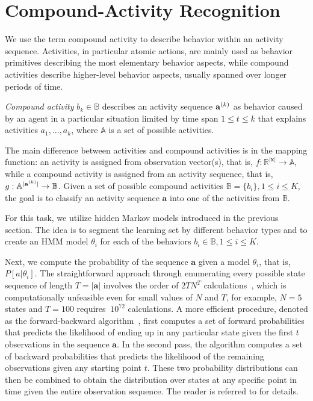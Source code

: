 %
%
\section{Compound-Activity Recognition}
\label{sec:ar:interactions}

We use the term compound activity to describe behavior within an activity sequence. %
Activities, in particular atomic actions, are mainly used as behavior primitives describing the most elementary behavior aspects, while compound activities describe higher-level behavior aspects, usually spanned over longer periods of time.

\begin{definition}
\label{def:compound_activity}
	\emph{Compound activity} $b_k \in \mathbb{B}$ describes an activity sequence $\mathbf{a}^{\scriptsize(k)}$ as behavior caused by an agent in a particular situation limited by time span $1 \leq t \leq k$ that explains activities $a_1, ..., a_k$, where $\mathbb{A}$ is a set of possible activities.
\end{definition}

The main difference between activities and compound activities is in the mapping function: an activity is assigned from observation vector(s), that is, $f: \mathbb{R}^{|\mathbf{x}|} \rightarrow \mathbb{A}$, while a compound activity is assigned from an activity sequence, that is, $g: \mathbb{A}^{|\mathbf{a}^{\scriptsize(k)}|} \rightarrow \mathbb{B}$. Given a set of possible compound activities $\mathbb{B}=\{b_i\}, 1 \leq i \leq K$, the goal is to classify an activity sequence $\mathbf{a}$ into one of the activities from $\mathbb{B}$.

For this task, we utilize hidden Markov models introduced in the previous section. The idea is to segment the learning set by different behavior types and to create an HMM model $\theta_i$ for each of the behaviors $b_i \in \mathbb{B}, 1 \leq i \leq K$.

Next, we compute the probability of the sequence $\mathbf{a}$ given a model $\theta_i$, that is, $P[a|\theta_i]$. The straightforward approach through enumerating every possible state sequence of length $T=|\mathbf{a}|$ involves the order of $2TN^T$ calculations~\citep{KollerFriedman2009}, which is computationally unfeasible even for small values of $N$ and $T$, for example, $N=5$ states and $T=100$ requires $~10^{72}$ calculations. A more efficient procedure, denoted as the forward-backward algorithm~\citep{Rabiner1989}, first computes a set of forward probabilities that predicts the likelihood of ending up in any particular state given the first $t$ observations in the sequence $\mathbf{a}$. In the second pass, the algorithm computes a set of backward probabilities that predicts the likelihood of the remaining observations given any starting point $t$. These two probability distributions can then be combined to obtain the distribution over states at any specific point in time given the entire observation sequence. The reader is referred to \cite{KollerFriedman2009} for details.

